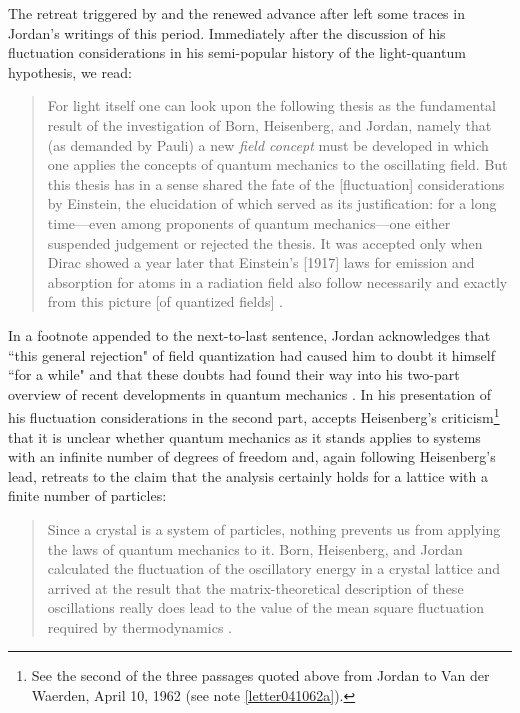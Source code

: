 \documentclass{elsart}
\begin{document}
The retreat triggered by \citep{Smekal 1926} and the renewed advance after \citep{Dirac 1927} left some traces in Jordan's writings of this period.
Immediately after the discussion of his fluctuation considerations in his semi-popular history of the light-quantum hypothesis, we read:
\begin{quotation}
For light itself one can look upon the following thesis as the fundamental result of the investigation of Born, Heisenberg, and Jordan, namely that (as demanded by Pauli) a new {\it field concept} must be developed in which one applies the concepts of quantum mechanics to the oscillating field. But this thesis has in a sense shared the fate of the [fluctuation] considerations by Einstein, the elucidation of which served as its justification: for a long time---even among proponents of quantum mechanics---one either suspended judgement or rejected the thesis. It was accepted only when Dirac showed a year later that Einstein's [1917] laws for emission and absorption for atoms in a radiation field also follow necessarily and exactly from this picture [of quantized fields] \citep[pp.\ 195--196]{Jordan 1928}.
\end{quotation}
In a footnote appended to the next-to-last sentence, Jordan acknowledges that ``this general rejection" of field quantization had caused him to doubt it himself ``for a while" and that these doubts had found their way into his two-part overview of recent developments in quantum mechanics \citep{Jordan 1927a, Jordan 1927b}. In his presentation of his fluctuation considerations in the second part, \citet[pp.\ 642--643]{Jordan 1927b} accepts Heisenberg's criticism\footnote{See the second of the three passages quoted above from Jordan to Van der Waerden, April 10, 1962 (see note \ref{letter041062a}).} that it is unclear whether quantum mechanics as it stands applies to systems with an infinite number of degrees of freedom and, again following Heisenberg's lead, retreats to the claim that the analysis certainly holds for a lattice with a finite number of particles:
\begin{quotation}
Since a crystal is a system of  particles, nothing prevents us from applying the laws of quantum mechanics to it. Born, Heisenberg, and Jordan calculated the fluctuation of the oscillatory energy in a crystal lattice and arrived at the result that the matrix-theoretical description of these oscillations really does lead to the value of the mean square fluctuation required by thermodynamics \citep[p.\ 643]{Jordan 1927b}.
\end{quotation}
\end{document}
